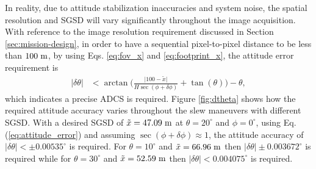 In reality, due to attitude stabilization inaccuracies and system noise, the spatial resolution and SGSD will vary significantly throughout the image acquisition. With reference to the image resolution requirement discussed in Section \ref{sec:mission-design}, in order to have a sequential pixel-to-pixel distance to be less than $100 \hspace{3pt} \rm{m}$, by using Eqs. \ref{eq:fov_x} and \ref{eq:footprint_x}, the attitude error requirement is
\begin{align}
    \vert \delta \theta \vert &< \arctan\bigg(\frac{\vert100-\tilde{x}\vert}{H\sec(\phi+\delta\phi)}+\tan(\theta) \bigg)-\theta, \label{eq:attitude_error}
\end{align}
\noindent which indicates a precise ADCS is required. Figure \ref{fig:dtheta} shows how the required attitude accuracy varies throughout the slew maneuvers with different SGSD.
With a desired SGSD of $\tilde{x}=47.09 \hspace{3pt} \rm{m}$ at $\theta=20^{\circ}$ and $\phi=0^{\circ}$, using Eq. (\ref{eq:attitude_error}) and assuming $\sec(\phi+\delta\phi)\approx 1$, the attitude accuracy of  $\vert\delta \theta\vert<\pm 0.00535^{\circ}$ is required. For $\theta=10^{\circ}$ and $\tilde{x}=66.96\hspace{3pt} \rm{m}$ then $\vert\delta \theta\vert\pm 0.003672^{\circ}$ is required while for $\theta=30^{\circ}$ and $\tilde{x}=52.59\hspace{3pt} \rm{m}$ then $\vert\delta \theta\vert<0.004075^{\circ}$ is required.
  


